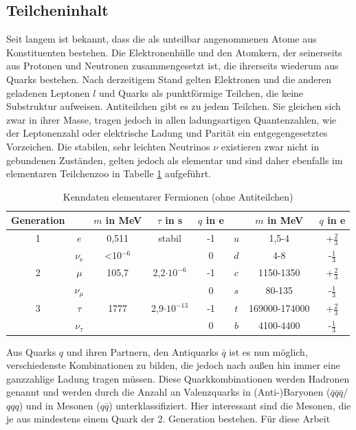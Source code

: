 \documentclass[11pt,a4paper,twoside]{report}
\begin{document}
\subsection{Teilcheninhalt}
Seit langem ist bekannt, dass die als unteilbar angenommenen Atome aus Konstituenten bestehen. Die Elektronenhülle und den Atomkern, der seinerseits aus
Protonen und Neutronen zusammengesetzt ist, die ihrerseits wiederum aus Quarks bestehen. Nach derzeitigem Stand gelten Elektronen und die anderen geladenen 
Leptonen $l$ und Quarks als punktförmige
Teilchen, die keine Substruktur aufweisen. Antiteilchen gibt es zu jedem Teilchen. Sie gleichen sich zwar in ihrer Masse, tragen jedoch in allen ladungsartigen Quantenzahlen, wie der Leptonenzahl oder
elektrische Ladung und Parität ein entgegengesetztes Vorzeichen. Die stabilen, sehr leichten Neutrinos $\nu$ existieren zwar nicht in gebundenen Zuständen, gelten jedoch als elementar und sind daher 
ebenfalls im elementaren Teilchenzoo \cite{PDG} in Tabelle \ref{tab_particlezoo} aufgeführt.
\begin{table}[H]
\begin{tabular}{c|cccc|ccc} \toprule 
 Generation & & $m$ in MeV & $\tau$ in s & $q$ in e & & $m$ in MeV & $q$ in e\\
 \midrule
  1 & $e$ & 0,511 & stabil & -1 & $u$ & 1,5-4 & +$\frac23$\\
  &$\nu_\text{e}$& <10$^{-6}$ &  & 0 & $d$ & 4-8 & -$\frac13$\\
  2 & $\mu$ & 105,7 & 2,2$\cdot 10^{-6}$ & -1 & $c$ &1150-1350& +$\frac23$\\
  &$\nu_\mu$ & & & 0 & $s$ &80-135& -$\frac13$\\
  3& $\tau$ &1777& 2,9$\cdot 10^{-13}$ & -1 & $t$ & 169000-174000 & +$\frac23$\\
  &$\nu_\tau$& & & 0 & $b$ &4100-4400 & -$\frac13$
\\\bottomrule \bottomrule
 \end{tabular}
\caption{Kenndaten elementarer Fermionen (ohne Antiteilchen)}
\label{tab_particlezoo}
\end{table}
\noindent
Aus Quarks $q$ und ihren Partnern, den Antiquarks $\bar q$ ist es nun möglich, verschiedenste Kombinationen zu bilden, die jedoch nach außen hin immer eine
ganzzahlige Ladung tragen müssen. Diese Quarkkombinationen werden Hadronen genannt und werden durch die Anzahl an Valenzquarks in (Anti-)Baryonen ($\bar q\bar q\bar q$/$qqq$) und in 
Mesonen ($q\bar q$) unterklassifiziert. Hier interessant sind die Mesonen, die je aus mindestens einem Quark der 2. Generation bestehen. Für diese Arbeit
\end{document}
